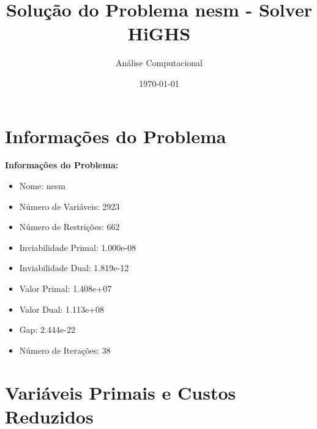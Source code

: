 \documentclass[12pt]{article}
\title{Solução do Problema nesm - Solver HiGHS}
\author{Análise Computacional}
\date{\today}
\begin{document}
\maketitle

\section{Informações do Problema}

\textbf{Informações do Problema:}
\begin{itemize}
\item Nome: nesm
\item Número de Variáveis: 2923
\item Número de Restrições: 662
\item Inviabilidade Primal: 1.000e-08
\item Inviabilidade Dual: 1.819e-12
\item Valor Primal: 1.408e+07
\item Valor Dual: 1.113e+08
\item Gap: 2.444e-22
\item Número de Iterações: 38
\end{itemize}


\section{Variáveis Primais e Custos Reduzidos}
\end{document}
